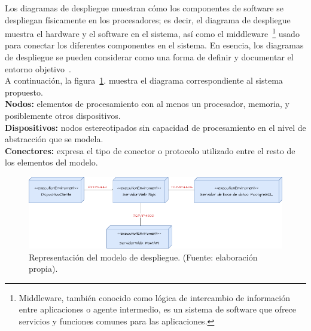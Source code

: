 Los diagramas de despliegue muestran cómo los componentes de software se despliegan
físicamente en los procesadores; es decir, el diagrama de despliegue muestra el hardware
y el software en el sistema, así como el middleware~\footnote{Middleware, también conocido como lógica de intercambio de información entre aplicaciones o agente intermedio, es un sistema de software que ofrece servicios y funciones comunes para las aplicaciones.} usado para conectar los diferentes
componentes en el sistema. En esencia, los diagramas de despliegue se pueden considerar
como una forma de definir y documentar el entorno objetivo~\cite{sommerville2011software}.\\
A continuación, la figura~\ref{fig:despliege}. muestra el diagrama correspondiente al sistema propuesto.\\
\textbf{Nodos:} elementos de procesamiento con al menos un procesador, memoria, y posiblemente otros dispositivos.\\
\textbf{Dispositivos:} nodos estereotipados sin capacidad de procesamiento en el nivel de abstracción que se modela.\\
\textbf{Conectores:} expresa el tipo de conector o protocolo utilizado entre el resto de los elementos del modelo.\\

\begin{figure}[h!]
	\centering
	\includegraphics[width=1\textwidth]{images/despliege.drawio.png}
	\caption{Representación del modelo de despliegue. (Fuente: elaboración propia).}
	\label{fig:despliege}
\end{figure}

